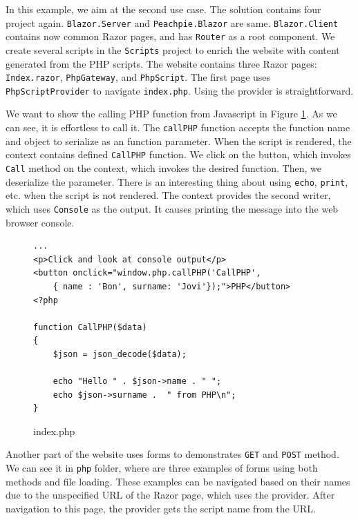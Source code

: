 In this example, we aim at the second use case.
The solution contains four project again.
\texttt{Blazor.Server} and \texttt{Peachpie.Blazor} are same.
\texttt{Blazor.Client} contains now common Razor pages, and has \texttt{Router} as a root component.
We create several scripts in the \texttt{Scripts} project to enrich the website with content generated from the PHP scripts.
The website contains three Razor pages: \texttt{Index.razor}, \texttt{PhpGateway}, and \texttt{PhpScript}.
The first page uses \texttt{PhpScriptProvider} to navigate \texttt{index.php}.
Using the provider is straightforward.
\par
We want to show the calling PHP function from Javascript in Figure \ref{img26:index}.
As we can see, it is effortless to call it.
The \texttt{callPHP} function accepts the function name and object to serialize as an function parameter.
When the script is rendered, the context contains defined \texttt{CallPHP} function.
We click on the button, which invokes \texttt{Call} method on the context, which invokes the desired function.
Then, we deserialize the parameter.
There is an interesting thing about using \texttt{echo}, \texttt{print}, etc. when the script is not rendered.
The context provides the second writer, which uses \texttt{Console} as the output.
It causes printing the message into the web browser console.
\begin{figure}
\begin{lstlisting}
...
<p>Click and look at console output</p>
<button onclick="window.php.callPHP('CallPHP',
	{ name : 'Bon', surname: 'Jovi'});">PHP</button>
<?php

function CallPHP($data)
{
    $json = json_decode($data); 

	echo "Hello " . $json->name . " ";
	echo $json->surname .  " from PHP\n";
}
\end{lstlisting}
\caption{index.php}
\label{img26:index}
\end{figure}
\par
Another part of the website uses forms to demonstrates \texttt{GET} and \texttt{POST} method.
We can see it in \texttt{php} folder, where are three examples of forms using both methods and file loading.
These examples can be navigated based on their names due to the unspecified URL of the Razor page, which uses the provider.
After navigation to this page, the provider gets the script name from the URL.
\par
